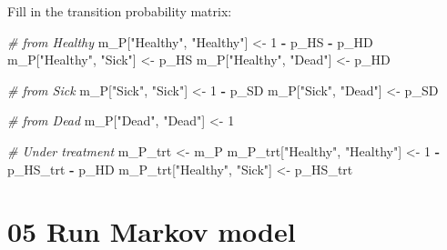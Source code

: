 \documentclass[
]{article}
\newenvironment{Shaded}{\begin{snugshade}}{\end{snugshade}}
\newcommand{\CommentTok}[1]{\textcolor[rgb]{0.56,0.35,0.01}{\textit{#1}}}
\newcommand{\ControlFlowTok}[1]{\textcolor[rgb]{0.13,0.29,0.53}{\textbf{#1}}}
\newcommand{\DecValTok}[1]{\textcolor[rgb]{0.00,0.00,0.81}{#1}}
\newcommand{\NormalTok}[1]{#1}
\newcommand{\OperatorTok}[1]{\textcolor[rgb]{0.81,0.36,0.00}{\textbf{#1}}}
\newcommand{\StringTok}[1]{\textcolor[rgb]{0.31,0.60,0.02}{#1}}
\begin{document}
Fill in the transition probability matrix:

\begin{Shaded}
\begin{Highlighting}[]
\CommentTok{# from Healthy}
\NormalTok{m_P[}\StringTok{"Healthy"}\NormalTok{, }\StringTok{"Healthy"}\NormalTok{] <-}\StringTok{ }\DecValTok{1} \OperatorTok{-}\StringTok{ }\NormalTok{p_HS }\OperatorTok{-}\StringTok{ }\NormalTok{p_HD}
\NormalTok{m_P[}\StringTok{"Healthy"}\NormalTok{, }\StringTok{"Sick"}\NormalTok{]    <-}\StringTok{ }\NormalTok{p_HS}
\NormalTok{m_P[}\StringTok{"Healthy"}\NormalTok{, }\StringTok{"Dead"}\NormalTok{]    <-}\StringTok{ }\NormalTok{p_HD}

\CommentTok{# from Sick}
\NormalTok{m_P[}\StringTok{"Sick"}\NormalTok{, }\StringTok{"Sick"}\NormalTok{] <-}\StringTok{ }\DecValTok{1} \OperatorTok{-}\StringTok{ }\NormalTok{p_SD}
\NormalTok{m_P[}\StringTok{"Sick"}\NormalTok{, }\StringTok{"Dead"}\NormalTok{] <-}\StringTok{ }\NormalTok{p_SD}

\CommentTok{# from Dead}
\NormalTok{m_P[}\StringTok{"Dead"}\NormalTok{, }\StringTok{"Dead"}\NormalTok{] <-}\StringTok{ }\DecValTok{1}

\CommentTok{# Under treatment}
\NormalTok{m_P_trt <-}\StringTok{ }\NormalTok{m_P}
\NormalTok{m_P_trt[}\StringTok{"Healthy"}\NormalTok{, }\StringTok{"Healthy"}\NormalTok{] <-}\StringTok{ }\DecValTok{1} \OperatorTok{-}\StringTok{ }\NormalTok{p_HS_trt }\OperatorTok{-}\StringTok{ }\NormalTok{p_HD}
\NormalTok{m_P_trt[}\StringTok{"Healthy"}\NormalTok{, }\StringTok{"Sick"}\NormalTok{]    <-}\StringTok{ }\NormalTok{p_HS_trt}
\end{Highlighting}
\end{Shaded}

\hypertarget{run-markov-model}{%
\section{05 Run Markov model}\label{run-markov-model}}

\begin{Shaded}
\end{Shaded}
\end{document}
